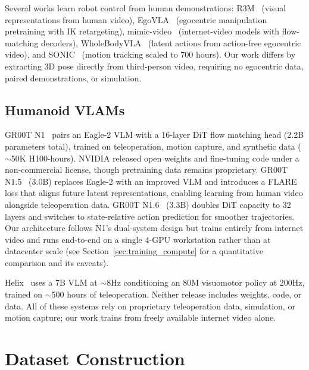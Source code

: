 \documentclass[letterpaper, 10pt, conference]{ieeeconf}
\begin{document}
Several works learn robot control from human demonstrations: R3M~\cite{r3m} (visual representations from human video), EgoVLA~\cite{egovla} (egocentric manipulation pretraining with IK retargeting), mimic-video~\cite{mimicvideo} (internet-video models with flow-matching decoders), WholeBodyVLA~\cite{wholebodyvla} (latent actions from action-free egocentric video), and SONIC~\cite{sonic} (motion tracking scaled to 700 hours). Our work differs by extracting 3D pose directly from third-person video, requiring no egocentric data, paired demonstrations, or simulation.

\subsection{Humanoid VLAMs}

GR00T N1~\cite{groot} pairs an Eagle-2 VLM with a 16-layer DiT flow matching head (2.2B parameters total), trained on teleoperation, motion capture, and synthetic data ($\sim$50K H100-hours). NVIDIA released open weights and fine-tuning code under a non-commercial license, though pretraining data remains proprietary. GR00T N1.5~\cite{groot_n15} (3.0B) replaces Eagle-2 with an improved VLM and introduces a FLARE loss that aligns future latent representations, enabling learning from human video alongside teleoperation data. GR00T N1.6~\cite{groot_n16} (3.3B) doubles DiT capacity to 32 layers and switches to state-relative action prediction for smoother trajectories. Our architecture follows N1's dual-system design but trains entirely from internet video and runs end-to-end on a single 4-GPU workstation rather than at datacenter scale (see Section~\ref{sec:training_compute} for a quantitative comparison and its caveats).

Helix~\cite{helix} uses a 7B VLM at $\sim$8Hz conditioning an 80M visuomotor policy at 200Hz, trained on $\sim$500 hours of teleoperation. Neither release includes weights, code, or data. All of these systems rely on proprietary teleoperation data, simulation, or motion capture; our work trains from freely available internet video alone.

\section{Dataset Construction}
\end{document}
